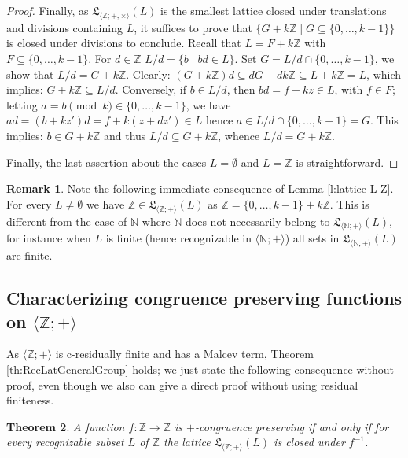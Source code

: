 \documentclass[11pt,a4paper]{article}
\newtheorem{theorem}{Theorem}[section]
\theoremstyle{definition} %
\newtheorem{remark}[theorem]{Remark}
\newcommand\+[1]{\mathcal{#1}} %
\newcommand{\N}{{\mathbb N}}     %
\newcommand{\Z}{{\mathbb Z}}     %
\newcommand{\Latt}{{\mathfrak{L}}}
\begin{document}
\begin{proof}
Finally, as $\Latt_{\langle  \Z ;+,\times\rangle}(L)$ is the smallest lattice closed under translations and divisions containing $L$, it suffices to prove that $\{G+k\Z\mid G\subseteq\{0,\ldots,k-1\}\}$ is closed under divisions to conclude. Recall that $L=F+k\Z$ with $ F\subseteq\{0,\ldots,k-1\}$. For $d\in\Z$ %
 $L/d=\{b\mid bd\in L\}$.
Set $G={L/d}\cap  \{0,\ldots,k-1\}$, we show that $L/d = G+k\Z$. Clearly: $(G+k\Z)d\subseteq dG+dk\Z\subseteq L+k\Z=L$, which implies: $G+k\Z\subseteq L/d$. 
Conversely, if $b\in L/d$, then 
$bd=f+kz\in L$, with $f\in F$; letting $a=b\pmod k\in \{0,\ldots,k-1\}$, we have $ad=(b+kz')d=f+k(z+dz')\in L$ hence $a\in {L/d}\cap  \{0,\ldots,k-1\}=G$. 
This implies: $b\in G+k\Z$ and thus $L/d \subseteq G+k\Z$, whence  $L/d = G+k\Z$.

\smallskip\noindent Finally, the last assertion about the cases $L=\emptyset$ and $L=\Z$ is straightforward.
\end{proof}
%
\begin{remark} Note the following immediate consequence of Lemma \ref{l:lattice L Z}.
For every $L\neq\emptyset$ we have $\Z\in\Latt_{\langle  \Z ;+\rangle}(L)$ as $\Z=\{0,\ldots,k-1\}+k\Z$. This is
different from the case of $\N$ where $\N$ does not necessarily belong to  $\Latt_{\langle  \N ;+\rangle}(L)$,
for instance when $L$ is finite (hence recognizable in $\langle\N;+\rangle$) all sets in $\Latt_{\langle  \N ;+\rangle}(L)$  are finite.
\end{remark}
%
\subsection{Characterizing congruence preserving functions on $\langle  \Z ;+\rangle$}\label{ss cp on Z+}
 As $\langle  \Z ;+\rangle$ is c-residually finite and has a Malcev term, Theorem \ref{th:RecLatGeneralGroup}   holds; we just state  the following consequence without proof, even though we also can give a direct proof without using residual finiteness.
%
\begin{theorem}\label{thm:mainZ1}%
A function $f:\Z\to\Z$ is %
$+$-congruence preserving if and only if for every  %
recognizable subset $L$ of $\Z$ the lattice $\Latt_{\langle  \Z ;+\rangle}(L)$ is  closed under $f^{-1}$.
\end{theorem}
%
\end{document}

